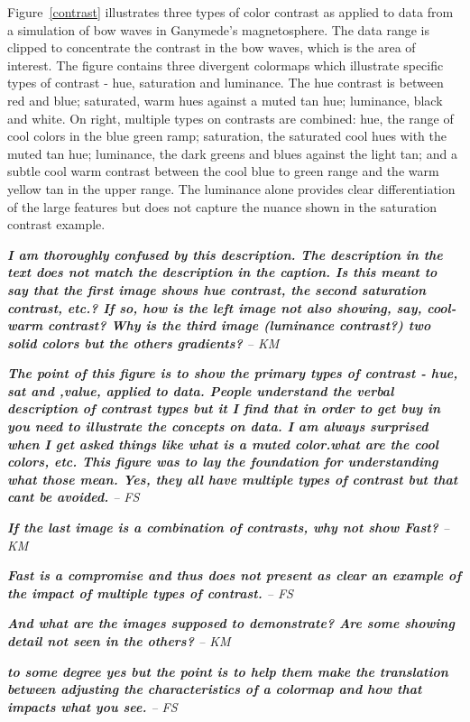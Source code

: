 \documentclass{IEEEcsmag}
\newcommand*{\km}[1]{\textcolor{km}{\emph{\textbf{#1} -- KM}}}
\newcommand*{\fs}[1]{\textcolor{fs}{\emph{\textbf{#1} -- FS}}}
\newcommand*{\colormap}[1]{\textsl{#1}\xspace}
\newcommand*{\fast}{\colormap{Fast}}
\begin{document}
Figure~\ref{contrast} illustrates three types of color contrast as applied to data from a simulation of bow waves in Ganymede's magnetosphere. The data range is clipped to concentrate the contrast in the bow waves, which is the area of interest. The figure contains three divergent colormaps which illustrate specific types of contrast - hue, saturation and luminance. The hue contrast is between red and blue; saturated, warm hues against a muted tan hue; luminance, black and white. On right, multiple types on contrasts are combined: hue, the range of cool colors in the blue green ramp; saturation, the saturated cool hues with the muted tan hue; luminance, the dark greens and blues against the light tan; and a subtle cool warm contrast between the cool blue to green range and the warm yellow tan in the upper range. The luminance alone provides clear differentiation of the large features but does not capture the nuance shown in the saturation contrast example.

\km{I am thoroughly confused by this description. The description in the text does not match the description in the caption. Is this meant to say that the first image shows hue contrast, the second saturation contrast, etc.? If so, how is the left image not also showing, say, cool-warm contrast? Why is the third image (luminance contrast?) two solid colors but the others gradients?}

\fs{The point of this figure is to show the primary types of contrast - hue, sat and ,value, applied to data. People understand the verbal description of contrast types but it I find that in order to get buy in you need to illustrate the concepts on data.
I am always surprised when I get asked things like what is a muted color.what are the cool colors, etc. This figure was to lay the foundation for understanding what those mean. Yes, they all have multiple types of contrast but that cant be avoided.}

\km{If the last image is a combination of contrasts, why not show \fast? }

\fs{Fast is a compromise and thus does not present as clear an example of the impact of multiple types of contrast.}

\km{And what are the images supposed to demonstrate? Are some showing detail not seen in the others?}

\fs{to some degree yes but the point is to help them make the translation between adjusting the characteristics of a colormap and how that impacts what you see.}
\end{document}
